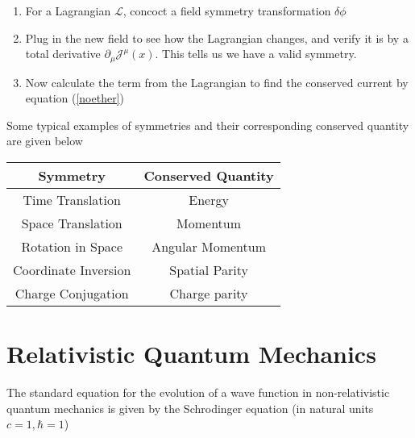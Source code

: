 \begin{enumerate}
    \item For a Lagrangian $\mathcal{L}$, concoct a field symmetry transformation $\delta\phi$
    \item Plug in the new field to see how the Lagrangian changes, and verify it is by a total derivative $\partial_\mu\mathcal{J}^\mu(x)$. This tells us we have a valid symmetry.
    \item Now calculate the term from the Lagrangian to find the conserved current by equation (\ref{noether})
\end{enumerate}

Some typical examples of symmetries and their corresponding conserved quantity are given below

\begin{center}
\begin{tabular}{ | c | c|} 
\hline
 Symmetry & Conserved Quantity\\ \hline
 Time Translation & Energy  \\ 
 Space Translation & Momentum  \\
Rotation in Space & Angular Momentum \\ 
Coordinate Inversion & Spatial Parity\\
Charge Conjugation & Charge parity \\
\hline
\end{tabular}
\end{center}


\section{Relativistic Quantum Mechanics}
The standard equation for the evolution of a wave function in non-relativistic quantum mechanics is given by the Schrodinger equation (in natural units $c=1,\hbar=1$) \cite{banfi}

